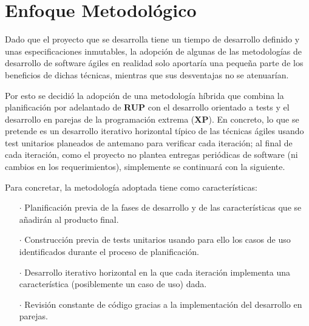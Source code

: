 \section*{Enfoque Metodológico}

Dado que el proyecto que se desarrolla tiene un tiempo de desarrollo definido y unas especificaciones inmutables, la adopción de algunas de las metodologías de desarrollo de software ágiles en realidad solo aportaría una pequeña parte de los beneficios de dichas técnicas, mientras que sus desventajas no se atenuarían.

Por esto se decidió la adopción de una metodología híbrida que combina la planificación por adelantado de \textbf{RUP} con el desarrollo orientado a tests y el desarrollo en parejas de la programación extrema (\textbf{XP}). En concreto, lo que se pretende es un desarrollo iterativo horizontal típico de las técnicas ágiles usando test unitarios planeados de antemano para verificar cada iteración; al final de cada iteración, como el proyecto no plantea entregas periódicas de software (ni cambios en los requerimientos), simplemente se continuará con la siguiente.

Para concretar, la metodología adoptada tiene como características:

\begin{enumerate}
  \item[\(\cdot\)] Planificación previa de la fases de desarrollo y de las características que se añadirán al producto final.
  \item[\(\cdot\)] Construcción previa de tests unitarios usando para ello los casos de uso identificados durante el proceso de planificación.
  \item[\(\cdot\)] Desarrollo iterativo horizontal en la que cada iteración implementa una característica (posiblemente un caso de uso) dada.
  \item[\(\cdot\)] Revisión constante de código gracias a la implementación del desarrollo en parejas.
\end{enumerate}
